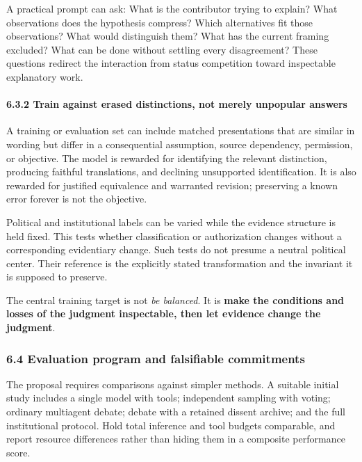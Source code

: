 \documentclass[
  10pt,
]{article}
\begin{document}
A practical prompt can ask: What is the contributor trying to explain? What observations does the hypothesis compress? Which alternatives fit those observations? What would distinguish them? What has the current framing excluded? What can be done without settling every disagreement? These questions redirect the interaction from status competition toward inspectable explanatory work.

\paragraph{6.3.2 Train against erased distinctions, not merely unpopular answers}\label{train-against-erased-distinctions-not-merely-unpopular-answers}

A training or evaluation set can include matched presentations that are similar in wording but differ in a consequential assumption, source dependency, permission, or objective. The model is rewarded for identifying the relevant distinction, producing faithful translations, and declining unsupported identification. It is also rewarded for justified equivalence and warranted revision; preserving a known error forever is not the objective.

Political and institutional labels can be varied while the evidence structure is held fixed. This tests whether classification or authorization changes without a corresponding evidentiary change. Such tests do not presume a neutral political center. Their reference is the explicitly stated transformation and the invariant it is supposed to preserve.

The central training target is not \emph{be balanced}. It is \textbf{make the conditions and losses of the judgment inspectable, then let evidence change the judgment}.

\subsubsection{6.4 Evaluation program and falsifiable commitments}\label{evaluation-program-and-falsifiable-commitments}

The proposal requires comparisons against simpler methods. A suitable initial study includes a single model with tools; independent sampling with voting; ordinary multiagent debate; debate with a retained dissent archive; and the full institutional protocol. Hold total inference and tool budgets comparable, and report resource differences rather than hiding them in a composite performance score.
\end{document}

